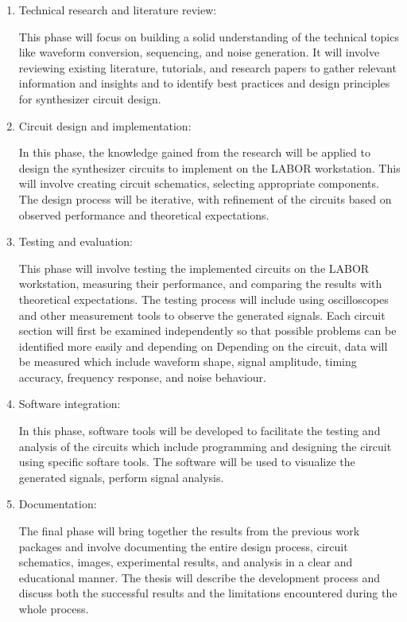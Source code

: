 \documentclass[
  11pt,
  a4paper,
  twoside]{scrbook}
\begin{document}
\begin{enumerate}
\def\labelenumi{\arabic{enumi}.}
\item
  Technical research and literature review:

  This phase will focus on building a solid understanding of the
  technical topics like waveform conversion, sequencing, and noise
  generation. It will involve reviewing existing literature, tutorials,
  and research papers to gather relevant information and insights and to
  identify best practices and design principles for synthesizer circuit
  design.
\item
  Circuit design and implementation:

  In this phase, the knowledge gained from the research will be applied
  to design the synthesizer circuits to implement on the LABOR
  workstation. This will involve creating circuit schematics, selecting
  appropriate components. The design process will be iterative, with
  refinement of the circuits based on observed performance and
  theoretical expectations.
\item
  Testing and evaluation:

  This phase will involve testing the implemented circuits on the LABOR
  workstation, measuring their performance, and comparing the results
  with theoretical expectations. The testing process will include using
  oscilloscopes and other measurement tools to observe the generated
  signals. Each circuit section will first be examined independently so
  that possible problems can be identified more easily and depending on
  Depending on the circuit, data will be measured which include waveform
  shape, signal amplitude, timing accuracy, frequency response, and
  noise behaviour.
\item
  Software integration:

  In this phase, software tools will be developed to facilitate the
  testing and analysis of the circuits which include programming and
  designing the circuit using specific softare tools. The software will
  be used to visualize the generated signals, perform signal analysis.
\item
  Documentation:

  The final phase will bring together the results from the previous work
  packages and involve documenting the entire design process, circuit
  schematics, images, experimental results, and analysis in a clear and
  educational manner. The thesis will describe the development process
  and discuss both the successful results and the limitations
  encountered during the whole process.
\end{enumerate}
\end{document}
